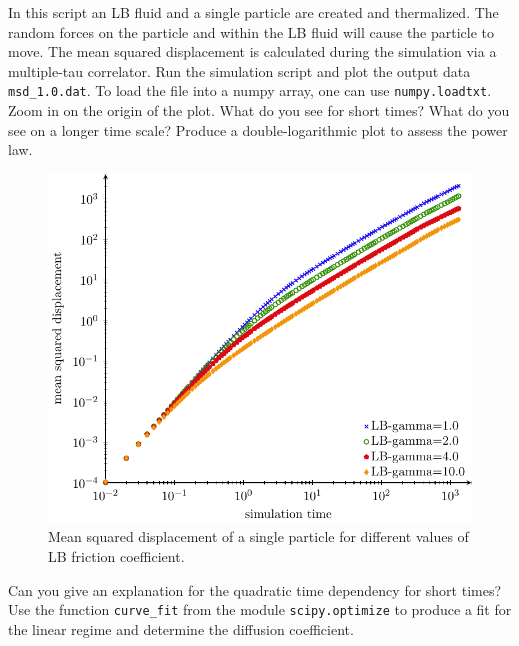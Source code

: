 In this script an LB fluid and a single particle are created and
thermalized. 
The random forces on the particle and
within the LB fluid will cause the particle to move. The mean squared
displacement is calculated during the simulation via a multiple-tau correlator. 
Run the simulation script and plot the output data \texttt{msd\_1.0.dat}. To
load the file into a numpy array, one can use \texttt{numpy.loadtxt}.
Zoom in on the origin of the plot. What do you see for short times? What do you
see on a longer time scale? Produce a double-logarithmic plot to assess the power
law.
\begin{figure}[h]
  \begin{center}
	  \includegraphics{figures/diffusion/msd.pdf}
  \end{center}
  \caption{Mean squared displacement of a single particle for different values
  of LB friction coefficient.}
\end{figure}

Can you give an explanation for the quadratic time dependency for short
times?
Use the function \texttt{curve\_fit} from the module \texttt{scipy.optimize} to
produce a fit for the linear regime and determine the diffusion coefficient.


